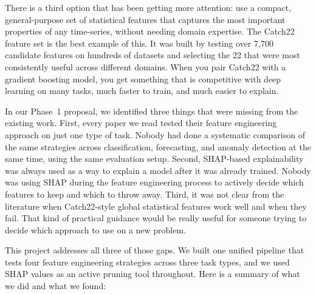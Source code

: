 \documentclass[10pt,conference]{IEEEtran}
\begin{document}
There is a third option that has been getting more attention: use a compact, general-purpose set of statistical features that captures the most important properties of any time-series, without needing domain expertise. The Catch22 feature set \cite{catch22} is the best example of this. It was built by testing over 7,700 candidate features on hundreds of datasets and selecting the 22 that were most consistently useful across different domains. When you pair Catch22 with a gradient boosting model, you get something that is competitive with deep learning on many tasks, much faster to train, and much easier to explain.

In our Phase~1 proposal, we identified three things that were missing from the existing work. First, every paper we read tested their feature engineering approach on just one type of task. Nobody had done a systematic comparison of the same strategies across classification, forecasting, and anomaly detection at the same time, using the same evaluation setup. Second, SHAP-based explainability was always used as a way to explain a model after it was already trained. Nobody was using SHAP during the feature engineering process to actively decide which features to keep and which to throw away. Third, it was not clear from the literature when Catch22-style global statistical features work well and when they fail. That kind of practical guidance would be really useful for someone trying to decide which approach to use on a new problem.

This project addresses all three of those gaps. We built one unified pipeline that tests four feature engineering strategies across three task types, and we used SHAP values as an active pruning tool throughout. Here is a summary of what we did and what we found:
\end{document}
